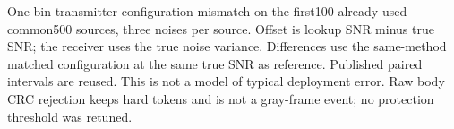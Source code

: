 One-bin transmitter configuration mismatch on the first100 already-used common500 sources, three noises per source. Offset is lookup SNR minus true SNR; the receiver uses the true noise variance. Differences use the same-method matched configuration at the same true SNR as reference. Published paired intervals are reused. This is not a model of typical deployment error. Raw body CRC rejection keeps hard tokens and is not a gray-frame event; no protection threshold was retuned.
